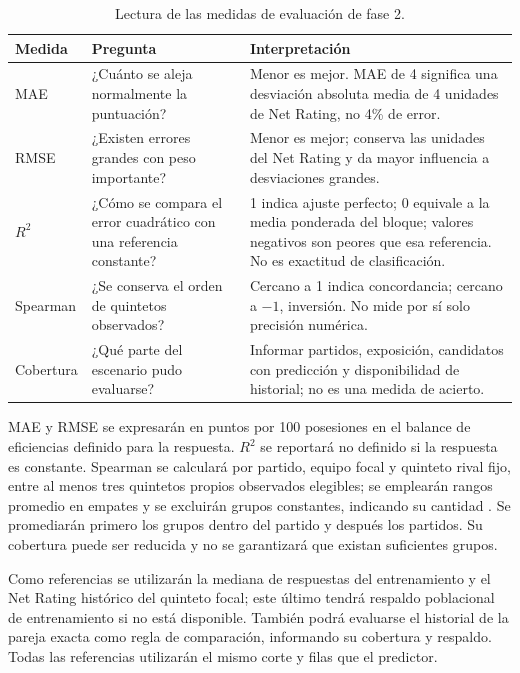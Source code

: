\begin{table}[htbp]
\centering\small
\caption{Lectura de las medidas de evaluación de fase 2.}
\begin{tabularx}{\textwidth}{@{}p{2.0cm}XX@{}}
\toprule
\textbf{Medida}&\textbf{Pregunta}&\textbf{Interpretación}\\\midrule
MAE & ¿Cuánto se aleja normalmente la puntuación? & Menor es mejor. MAE de 4 significa una desviación absoluta media de 4 unidades de Net Rating, no 4\% de error.\\
RMSE & ¿Existen errores grandes con peso importante? & Menor es mejor; conserva las unidades del Net Rating y da mayor influencia a desviaciones grandes.\\
$R^2$ & ¿Cómo se compara el error cuadrático con una referencia constante? & 1 indica ajuste perfecto; 0 equivale a la media ponderada del bloque; valores negativos son peores que esa referencia. No es exactitud de clasificación.\\
Spearman & ¿Se conserva el orden de quintetos observados? & Cercano a 1 indica concordancia; cercano a $-1$, inversión. No mide por sí solo precisión numérica.\\
Cobertura & ¿Qué parte del escenario pudo evaluarse? & Informar partidos, exposición, candidatos con predicción y disponibilidad de historial; no es una medida de acierto.\\
\bottomrule
\end{tabularx}
\end{table}

MAE y RMSE se expresarán en puntos por 100 posesiones en el balance de eficiencias definido para la respuesta. $R^2$ se reportará no definido si la respuesta es constante. Spearman se calculará por partido, equipo focal y quinteto rival fijo, entre al menos tres quintetos propios observados elegibles; se emplearán rangos promedio en empates y se excluirán grupos constantes, indicando su cantidad \cite{scipySpearman6161}. Se promediarán primero los grupos dentro del partido y después los partidos. Su cobertura puede ser reducida y no se garantizará que existan suficientes grupos.

Como referencias se utilizarán la mediana de respuestas del entrenamiento y el Net Rating histórico del quinteto focal; este último tendrá respaldo poblacional de entrenamiento si no está disponible. También podrá evaluarse el historial de la pareja exacta como regla de comparación, informando su cobertura y respaldo. Todas las referencias utilizarán el mismo corte y filas que el predictor.

